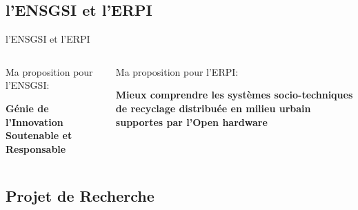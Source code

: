 \documentclass[
  11pt,
  ignorenonframetext,
  aspectratio=169,
  c]{beamer}
\begin{document}
\hypertarget{lensgsi-et-lerpi}{%
\subsection{l'ENSGSI et l'ERPI}\label{lensgsi-et-lerpi}}

\begin{frame}[t]{l'ENSGSI et l'ERPI}
\begin{columns}[T]
\begin{column}[T]{0.5\textwidth}
Ma proposition pour l'ENSGSI: \vspace{1cm}

\textbf{Génie de l'Innovation Soutenable et Responsable}
\end{column}

\begin{column}[T]{0.5\textwidth}
Ma proposition pour l'ERPI:

\vspace{1cm}

\textbf{Mieux comprendre les systèmes socio-techniques de recyclage
distribuée en milieu urbain supportes par l'Open hardware}

\vfill
\end{column}
\end{columns}

\large

\normalsize
\end{frame}

\hypertarget{projet-de-recherche}{%
\subsection{Projet de Recherche}\label{projet-de-recherche}}
\end{document}
